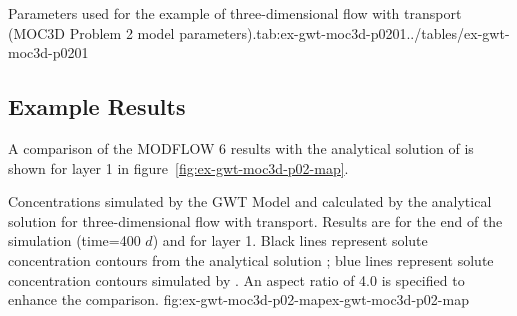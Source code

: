 \begin{StandardTable}{Parameters used for the example of three-dimensional flow with transport (MOC3D Problem 2 model parameters).}{tab:ex-gwt-moc3d-p0201}{../tables/ex-gwt-moc3d-p0201}
\end{StandardTable}

\subsection{Example Results}

A comparison of the MODFLOW 6 results with the analytical solution of \cite{wexler1992} is shown for layer 1 in figure~\ref{fig:ex-gwt-moc3d-p02-map}.

\begin{StandardFigure}{
                                     Concentrations simulated by the \mf GWT Model and calculated by the analytical solution for three-dimensional flow with transport.  Results are for the end of the simulation (time=400 $d$) and for layer 1.  Black lines represent solute concentration contours from the analytical solution \citep{wexler1992}; blue lines represent solute concentration contours simulated by \mf.  An aspect ratio of 4.0 is specified to enhance the comparison.
                                     }{fig:ex-gwt-moc3d-p02-map}{ex-gwt-moc3d-p02-map}
\end{StandardFigure}            

                
